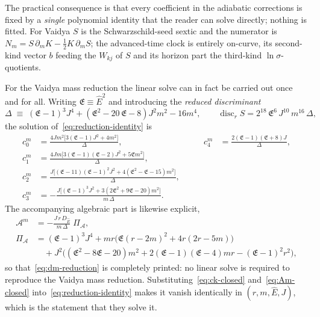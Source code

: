 \documentclass[12pt]{iopart}
\newcommand{\Ehat}{\hat E}
\theoremstyle{plain}
\theoremstyle{definition}
\theoremstyle{plain}
\theoremstyle{remark}
\begin{document}
The practical consequence is that every coefficient in the adiabatic corrections is fixed
by a \emph{single} polynomial identity that the reader can solve directly; nothing is
fitted. For Vaidya $S$ is the
Schwarzschild-seed sextic and the numerator is
$N_m=S\,\partial_m K-\tfrac12K\,\partial_m S$; the advanced-time clock is entirely
on-curve, its second-kind vector $b$ feeding the $W_{kj}$ of $S$ and its horizon part the
third-kind $\ln\sigma$-quotients.

For the Vaidya mass reduction the linear solve can in fact be carried out once and for
all. Writing $\mathfrak E\equiv\Ehat^{2}$ and introducing the \emph{reduced discriminant}
\begin{equation}
   \Delta\;\equiv\;(\mathfrak E-1)^3J^4+(\mathfrak E^2-20\,\mathfrak E-8)J^2m^2-16m^4,
   \qquad
   \operatorname{disc}_rS=2^{18}\,\mathfrak E^{6}\,J^{10}\,m^{16}\,\Delta,
   \label{eq:reduced-disc}
\end{equation}
the solution of~\eqref{eq:reduction-identity} is
\begin{equation}
\begin{aligned}
   c_0^m&=\frac{4Jm^2\big[3(\mathfrak E-1)J^2+4m^2\big]}{\Delta},&\qquad
   c_4^m&=\frac{2(\mathfrak E-1)(\mathfrak E+8)J}{\Delta},\\[2pt]
   c_1^m&=\frac{4Jm\big[3(\mathfrak E-1)(\mathfrak E-2)J^2+5\mathfrak Em^2\big]}{\Delta},\\[2pt]
   c_2^m&=\frac{J\big[(\mathfrak E-11)(\mathfrak E-1)^2J^2
     +4(\mathfrak E^2-\mathfrak E-15)m^2\big]}{\Delta},\\[2pt]
   c_3^m&=-\frac{J\big[(\mathfrak E-1)^3J^2
     +3(2\mathfrak E^2+9\mathfrak E-20)m^2\big]}{m\,\Delta}.
\end{aligned}
   \label{eq:ck-closed}
\end{equation}
The accompanying algebraic part is likewise explicit,
\begin{equation}
\begin{aligned}
   \mathcal{A}^m&=-\frac{J\,r\,D_{\Ehat}}{m\,\Delta}\;\Pi_{\mathcal A},\\
   \Pi_{\mathcal A}&=(\mathfrak E-1)^3J^4
     +mr\big(\mathfrak E(r-2m)^2+4r(2r-5m)\big)\\
   &\quad+J^2\big((\mathfrak E^2-8\mathfrak E-20)m^2
     +2(\mathfrak E-1)(\mathfrak E-4)mr-(\mathfrak E-1)^2r^2\big),
\end{aligned}
   \label{eq:Am-closed}
\end{equation}
so that~\eqref{eq:dm-reduction} is completely printed: no linear solve is required to
reproduce the Vaidya mass reduction. Substituting~\eqref{eq:ck-closed}
and~\eqref{eq:Am-closed} into~\eqref{eq:reduction-identity} makes it vanish identically in
$(r,m,\Ehat,J)$, which is the statement that they solve it.
\end{document}
